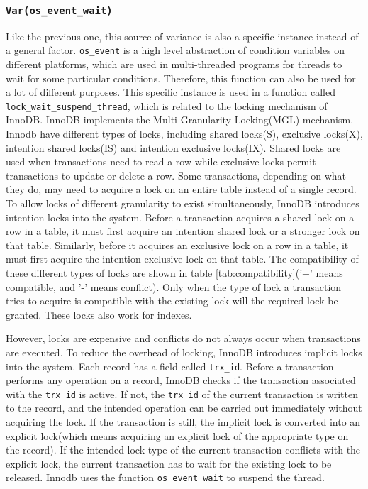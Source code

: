 \subsubsection{\texttt{Var(os\_event\_wait)}}
Like the previous one, this source of variance is also a specific instance
instead of a general factor. \texttt{os\_event} is a high level abstraction of
condition variables on different platforms, which are used in multi-threaded
programs for threads to wait for some particular conditions. Therefore, this
function can also be used for a lot of different purposes. This specific
instance is used in a function called \texttt{lock\_wait\_suspend\_thread},
which is related to the locking mechanism of InnoDB. InnoDB implements the
Multi-Granularity Locking(MGL) mechanism. Innodb have different types of locks,
including shared locks(S), exclusive locks(X), intention shared locks(IS) and
intention exclusive locks(IX). Shared locks are used when transactions need to
read a row while exclusive locks permit transactions to update or delete a row.
Some transactions, depending on what they do, may need to acquire a lock on an
entire table instead of a single record. To allow locks of different
granularity to exist simultaneously, InnoDB introduces intention locks into the
system. Before a transaction acquires a shared lock on a row in a table, it
must first acquire an intention shared lock or a stronger lock on that table.
Similarly, before it acquires an exclusive lock on a row in a table, it must
first acquire the intention exclusive lock on that table. The compatibility of
these different types of locks are shown in table \ref{tab:compatibility}('+'
means compatible, and '-' means conflict). Only when the type of lock a
transaction tries to acquire is compatible with the existing lock will the
required lock be granted. These locks also work for indexes.

However, locks are expensive and conflicts do not always occur when
transactions are executed. To reduce the overhead of locking, InnoDB introduces
implicit locks into the system. Each record has a field called \texttt{trx\_id}.
Before a transaction performs any operation on a record, InnoDB checks
if the transaction associated with the \texttt{trx\_id} is active. If not, the
\texttt{trx\_id} of the current transaction is written to the record, and the
intended operation can be carried out immediately without acquiring the lock.
If the transaction is still, the implicit lock is converted into an explicit
lock(which means acquiring an explicit lock of the appropriate type on the
record). If the intended lock type of the current transaction conflicts with
the explicit lock, the current transaction has to wait for the existing lock to
be released. Innodb uses the function \texttt{os\_event\_wait} to suspend the
thread.

